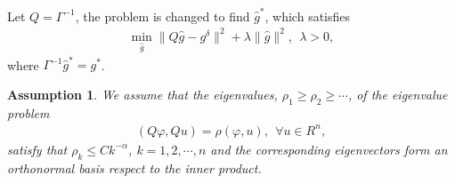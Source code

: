 \documentclass[11pt]{article}
\newtheorem{assumption}{Assumption}
\numberwithin{equation}{section}
\begin{document}
\iffalse
Let $Q=\Gamma^{-1}$, the problem is changed to find $\hat{g}^*$, which satisfies
\begin{align}\label{reg-2}
\min\limits_{\hat{g}} \|Q\hat{g}-g^\delta\|^2 + \lambda\|\hat{g}\|^2, ~~\lambda>0,   
\end{align}
where $\Gamma^{-1}\hat{g}^*=g^*$.


\begin{assumption}\label{ass-1} We assume that the eigenvalues, $\rho_1\geq\rho_2\geq\cdots$, of the eigenvalue problem
\begin{align*}
(Q\varphi,Qu)=\rho(\varphi,u),~~\forall u\in R^n,    
\end{align*}
satisfy that $\rho_k\leq Ck^{-\alpha}$, $k=1,2,\cdots,n$ and the corresponding eigenvectors form an orthonormal basis respect to the inner product.
\end{assumption}
\end{document}
